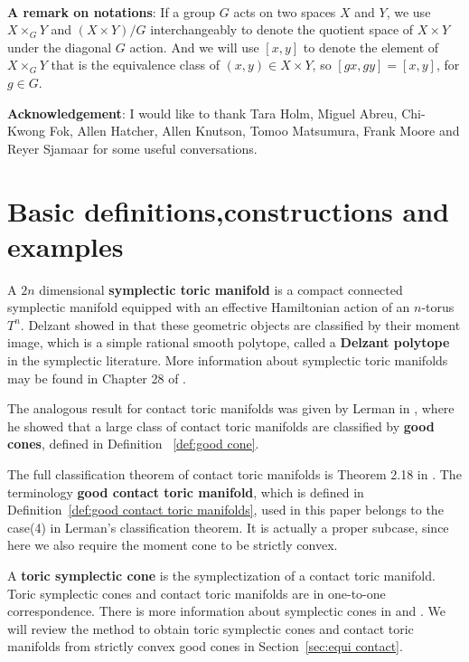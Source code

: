 \documentclass[12pt]{amsart}
\theoremstyle{definition}
\numberwithin{equation}{section}
\begin{document}
 \

{\bf A remark on notations}: If a group $G$ acts on two spaces $X$
and $Y$, we use $X\times_{G} Y$ and $(X\times Y)/G$ interchangeably
to denote the quotient space of $X\times Y$ under the diagonal $G$
action. And we will use $[x,y]$ to denote the element of
$X\times_{G}Y$ that is the equivalence class of $(x,y)\in X\times
Y$, so $[gx, gy]=[x,y]$, for $g\in G$.

{\bf Acknowledgement}: I would like to thank Tara Holm, Miguel
Abreu, Chi-Kwong Fok, Allen Hatcher, Allen Knutson, Tomoo Matsumura,
Frank Moore and Reyer Sjamaar for some useful conversations.

\section{\bf Basic definitions,constructions and examples}\label{sec:basic con}

A $2n$ dimensional {\bf symplectic toric manifold} is a compact
connected symplectic manifold equipped with an effective Hamiltonian
action of an $n$-torus $T^n$. Delzant showed in \cite{Delzant} that
these geometric objects are classified by their moment image, which
is a simple rational smooth polytope, called a {\bf Delzant
polytope} in the symplectic literature. More information about
symplectic toric manifolds may be found in Chapter 28 of
\cite{CdS:book}.

The analogous result for contact toric manifolds was given by Lerman
in \cite{L:contact toric}, where he showed that a large class of
contact toric manifolds are classified by {\bf good cones}, defined
in Definition ~\ref{def:good cone}.

 The full
classification theorem of contact toric manifolds is Theorem 2.18 in
\cite{L:contact toric}. The terminology {\bf good contact toric
manifold}, which is defined in Definition~\ref{def:good contact
toric manifolds}, used in this paper belongs to the case(4) in
Lerman's classification theorem. It is actually a proper subcase,
since here we also require the moment cone to be strictly convex.

A {\bf toric symplectic cone} is the symplectization of a contact
toric manifold. Toric symplectic cones and contact toric manifolds
are in one-to-one correspondence. There is more information about
symplectic cones in \cite{L:geodesic flows} and \cite{AM:contact
homology}. We will review the method to obtain toric symplectic
cones and contact toric manifolds from strictly convex good cones in
Section~\ref{sec:equi contact}.
\end{document}
